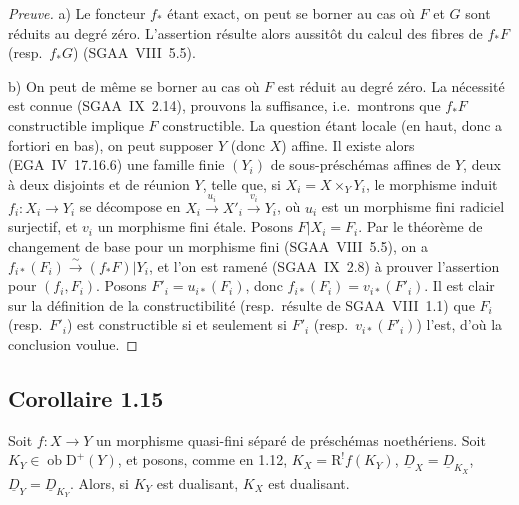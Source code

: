 \documentclass[11pt]{article}
\newcommand{\R}{\mathrm{R}}
\newcommand{\D}{\mathrm{D}}
\newcommand{\ob}{\operatorname{ob}}
\providecommand{\ob}{\operatorname{ob}}
\providecommand{\R}{\mathrm R}
\begin{document}
\begin{proof}[Preuve]
a) Le foncteur $f_{*}$ étant exact, on peut se borner au cas où $F$ et $G$ sont réduits au degré zéro. L'assertion résulte alors aussitôt du calcul des fibres de $f_{*}F$ (resp.~$f_{*}G$) (SGAA~VIII~5.5).

b) On peut de même se borner au cas où $F$ est réduit au degré zéro. La nécessité est connue (SGAA~IX~2.14), prouvons la suffisance, i.e.~montrons que $f_{*}F$ constructible implique $F$ constructible. La question étant locale (en haut, donc a fortiori en bas), on peut supposer $Y$ (donc $X$) affine. Il existe alors (EGA~IV~17.16.6) une famille finie $(Y_i)$ de sous-préschémas affines de $Y$, deux à deux disjoints et de réunion $Y$, telle que, si $X_i = X \times_Y Y_i$, le morphisme induit $f_i : X_i \to Y_i$ se décompose en $X_i \xrightarrow{u_i} X'_i \xrightarrow{v_i} Y_i$, où $u_i$ est un morphisme fini radiciel surjectif, et $v_i$ un morphisme fini étale. Posons $F|X_i = F_i$. Par le théorème de changement de base pour un morphisme fini (SGAA~VIII~5.5), on a $f_{i*}(F_i) \xrightarrow{\sim} (f_{*}F)|Y_i$, et l'on est ramené (SGAA~IX~2.8) à prouver l'assertion pour $(f_i, F_i)$. Posons $F'_i = u_{i*}(F_i)$, donc $f_{i*}(F_i) = v_{i*}(F'_i)$. Il est clair sur la définition de la constructibilité (resp.~résulte de SGAA~VIII~1.1) que $F_i$ (resp.~$F'_i$) est constructible si et seulement si $F'_i$ (resp.~$v_{i*}(F'_i)$) l'est, d'où la conclusion voulue.
\end{proof}

\subsection*{Corollaire 1.15}
Soit $f : X \to Y$ un morphisme quasi-fini séparé de préschémas noethériens. Soit $K_Y \in \ob \D^{+}(Y)$, et posons, comme en 1.12, $K_X = \R^{!}f(K_Y)$, $\underline{D}_X = \underline{D}_{K_X}$, $\underline{D}_Y = \underline{D}_{K_Y}$. Alors, si $K_Y$ est dualisant, $K_X$ est dualisant.
\end{document}

